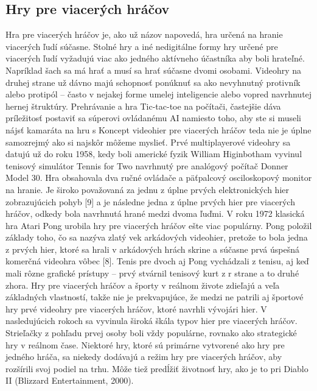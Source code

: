 \documentclass[10pt,twoside,slovak,a4paper]{article}
\begin{document}
\subsection{Hry pre viacerých hráčov}
Hra pre viacerých hráčov je, ako už názov napovedá, hra určená na hranie viacerých ľudí súčasne. Stolné hry a iné nedigitálne formy hry určené pre viacerých ľudí vyžadujú viac ako jedného aktívneho účastníka aby boli hrateľné. Napríklad šach sa má hrať a musí sa hrať súčasne dvomi osobami. Videohry na druhej strane už dávno majú schopnosť ponúknuť sa ako nevyhnutný protivník alebo protipól – často v nejakej forme umelej inteligencie alebo vopred navrhnutej hernej štruktúry. Prehrávanie a hra Tic-tac-toe na počítači, častejšie dáva príležitosť postaviť sa súperovi ovládanému AI namiesto toho, aby ste si museli nájsť kamaráta na hru s Koncept videohier pre viacerých hráčov teda nie je úplne samozrejmý ako si najskôr môžeme myslieť. Prvé multiplayerové videohry sa datujú už do roku 1958, kedy boli americké fyzik William Higinbotham vyvinul tenisový simulátor Tennis for Two navrhnutý pre analógový počítač Donner Model 30. Hra obsahovala dva ručné ovládače a päťpalcový osciloskopový monitor na hranie. Je široko považovaná za jednu z úplne prvých elektronických hier zobrazujúcich pohyb [9] a je následne jedna z úplne prvých hier pre viacerých hráčov, odkedy bola navrhnutá hrané medzi dvoma ľuďmi. V roku 1972 klasická hra Atari Pong urobila hry pre viacerých hráčov ešte viac populárny. Pong položil základy toho, čo sa nazýva zlatý vek arkádových videohier, pretože to bola jedna z prvých hier, ktoré sa hrali v arkádových hrách skrine a súčasne prvá úspešná komerčná videohra vôbec [8]. Tenis pre dvoch aj Pong vychádzali z tenisu, aj keď mali rôzne grafické prístupy – prvý stvárnil tenisový kurt z r strane a to druhé zhora. Hry pre viacerých hráčov a športy v reálnom živote zdieľajú a veľa základných vlastností, takže nie je prekvapujúce, že medzi ne patrili aj športové hry prvé videohry pre viacerých hráčov, ktoré navrhli vývojári hier. V nasledujúcich rokoch sa vyvinula široká škála typov hier pre viacerých hráčov. Strieľačky z pohľadu prvej osoby boli vždy populárne, rovnako ako strategické hry v reálnom čase. Niektoré hry, ktoré sú primárne vytvorené ako hry pre jedného hráča, sa niekedy dodávajú a režim hry pre viacerých hráčov, aby rozšírili svoj podiel na trhu. Môže tiež predĺžiť životnosť hry, ako je to pri Diablo II (Blizzard Entertainment, 2000). ~\cite{Bornemark:SFfEG}
\end{document}
